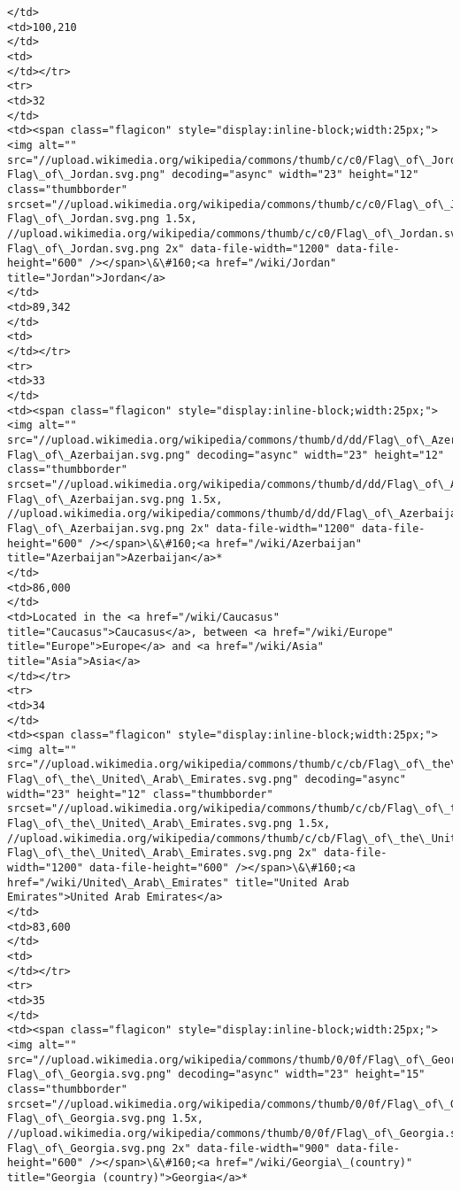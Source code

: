 \documentclass[11pt]{article}
\begin{document}
\begin{Verbatim}[commandchars=\\\{\}]
</td>
<td>100,210
</td>
<td>
</td></tr>
<tr>
<td>32
</td>
<td><span class="flagicon" style="display:inline-block;width:25px;"><img alt="" src="//upload.wikimedia.org/wikipedia/commons/thumb/c/c0/Flag\_of\_Jordan.svg/23px-Flag\_of\_Jordan.svg.png" decoding="async" width="23" height="12" class="thumbborder" srcset="//upload.wikimedia.org/wikipedia/commons/thumb/c/c0/Flag\_of\_Jordan.svg/35px-Flag\_of\_Jordan.svg.png 1.5x, //upload.wikimedia.org/wikipedia/commons/thumb/c/c0/Flag\_of\_Jordan.svg/46px-Flag\_of\_Jordan.svg.png 2x" data-file-width="1200" data-file-height="600" /></span>\&\#160;<a href="/wiki/Jordan" title="Jordan">Jordan</a>
</td>
<td>89,342
</td>
<td>
</td></tr>
<tr>
<td>33
</td>
<td><span class="flagicon" style="display:inline-block;width:25px;"><img alt="" src="//upload.wikimedia.org/wikipedia/commons/thumb/d/dd/Flag\_of\_Azerbaijan.svg/23px-Flag\_of\_Azerbaijan.svg.png" decoding="async" width="23" height="12" class="thumbborder" srcset="//upload.wikimedia.org/wikipedia/commons/thumb/d/dd/Flag\_of\_Azerbaijan.svg/35px-Flag\_of\_Azerbaijan.svg.png 1.5x, //upload.wikimedia.org/wikipedia/commons/thumb/d/dd/Flag\_of\_Azerbaijan.svg/46px-Flag\_of\_Azerbaijan.svg.png 2x" data-file-width="1200" data-file-height="600" /></span>\&\#160;<a href="/wiki/Azerbaijan" title="Azerbaijan">Azerbaijan</a>*
</td>
<td>86,000
</td>
<td>Located in the <a href="/wiki/Caucasus" title="Caucasus">Caucasus</a>, between <a href="/wiki/Europe" title="Europe">Europe</a> and <a href="/wiki/Asia" title="Asia">Asia</a>
</td></tr>
<tr>
<td>34
</td>
<td><span class="flagicon" style="display:inline-block;width:25px;"><img alt="" src="//upload.wikimedia.org/wikipedia/commons/thumb/c/cb/Flag\_of\_the\_United\_Arab\_Emirates.svg/23px-Flag\_of\_the\_United\_Arab\_Emirates.svg.png" decoding="async" width="23" height="12" class="thumbborder" srcset="//upload.wikimedia.org/wikipedia/commons/thumb/c/cb/Flag\_of\_the\_United\_Arab\_Emirates.svg/35px-Flag\_of\_the\_United\_Arab\_Emirates.svg.png 1.5x, //upload.wikimedia.org/wikipedia/commons/thumb/c/cb/Flag\_of\_the\_United\_Arab\_Emirates.svg/46px-Flag\_of\_the\_United\_Arab\_Emirates.svg.png 2x" data-file-width="1200" data-file-height="600" /></span>\&\#160;<a href="/wiki/United\_Arab\_Emirates" title="United Arab Emirates">United Arab Emirates</a>
</td>
<td>83,600
</td>
<td>
</td></tr>
<tr>
<td>35
</td>
<td><span class="flagicon" style="display:inline-block;width:25px;"><img alt="" src="//upload.wikimedia.org/wikipedia/commons/thumb/0/0f/Flag\_of\_Georgia.svg/23px-Flag\_of\_Georgia.svg.png" decoding="async" width="23" height="15" class="thumbborder" srcset="//upload.wikimedia.org/wikipedia/commons/thumb/0/0f/Flag\_of\_Georgia.svg/35px-Flag\_of\_Georgia.svg.png 1.5x, //upload.wikimedia.org/wikipedia/commons/thumb/0/0f/Flag\_of\_Georgia.svg/45px-Flag\_of\_Georgia.svg.png 2x" data-file-width="900" data-file-height="600" /></span>\&\#160;<a href="/wiki/Georgia\_(country)" title="Georgia (country)">Georgia</a>*

\end{Verbatim}
\end{document}
